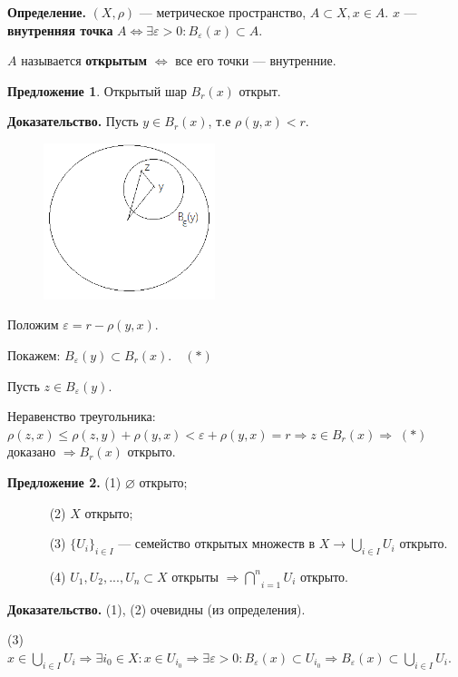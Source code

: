 \documentclass[12pt,a4paper]{article}
\begin{document}
\textbf{Определение.} $(X, \rho)$ --- метрическое пространство, $A \subset X, x \in A.$
$x$ --- \textbf{внутренняя точка} $A \Leftrightarrow \exists \varepsilon > 0: B_{\varepsilon}(x) \subset A.$ 

$A$ называется \textbf{открытым} $\Leftrightarrow$ все его точки --- внутренние.

\textbf{Предложение 1}. Открытый шар $B_r(x)$ открыт.

\textbf{Доказательство.} Пусть $y \in B_r(x)$, т.е $\rho(y,x) < r.$ 

\begin{figure}
	\includegraphics[width = 5cm]{lect2_2.png}
\end{figure}

Положим $\varepsilon = r - \rho(y,x).$

Покажем: $B_{\varepsilon}(y) \subset B_r(x). \quad (*)$

Пусть $z \in B_{\varepsilon}(y).$

Неравенство треугольника: $\rho(z, x) \leq \rho(z, y) + \rho(y, x)< \varepsilon + \rho(y, x) = r \Rightarrow z \in B_r(x) \Rightarrow \; (*)$ доказано $\Rightarrow B_r(x)$ открыто. 

\textbf{Предложение 2.} (1) $\varnothing$ открыто;

$\quad \quad \quad$ (2) $X$ открыто;

$\quad \quad \quad$ (3) $\{U_i\}_{i \in I}$ --- семейство открытых множеств в $X \rightarrow \underset{i \in I}{\bigcup} U_i$ открыто.

$\quad \quad \quad$ (4) $U_1, U_2, ..., U_n \subset X$ открыты $\Rightarrow \underset{i = 1}{\overset{n}{\bigcap}} U_i$ открыто.

\textbf{Доказательство.} (1), (2) очевидны (из определения).

(3) $x \in \underset{i \in I}{\bigcup} U_i \Rightarrow \exists i_0 \in X\!\!: x \in U_{i_0} \Rightarrow \exists \varepsilon > 0\!\!: B_{\varepsilon}(x) \subset U_{i_0} \Rightarrow B_{\varepsilon}(x) \subset \underset{i \in I}{\bigcup} U_i.$
\end{document}
